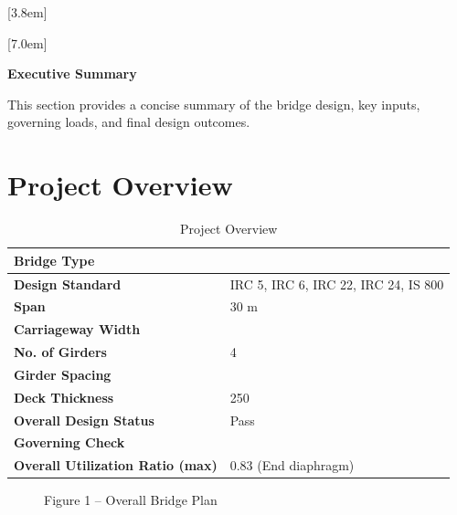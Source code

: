 \documentclass[12pt,a4paper]{report}
\numberwithin{figure}{chapter}
\begin{document}
[3.8em]
  {\normalfont}
  {\contentslabel{2.3em}}
  {\hspace*{-2.3em}}
  {\hfill\contentspage}

[7.0em]
  {\normalfont}
  {\contentslabel{3.2em}}
  {\hspace*{-3.2em}}
  {\hfill\contentspage}

\newpage
\renewcommand{\contentsname}{\centering\Large\bfseries Table of Contents}
\tableofcontents


\newpage
{\centering\Large\bfseries Executive Summary\par}
\vspace{0.8em}
\setcounter{table}{0}
\renewcommand{\thetable}{E.\arabic{table}}

This section provides a concise summary of the bridge design, key inputs, governing loads, and final design outcomes.

\section*{Project Overview}
\label{sec:project-overview}

\begin{table}[H]
\centering
{}
\caption{Project Overview}
\begin{tabular}{|L{5.73cm}|L{8.85cm}|}
\hline
\textbf{Bridge Type} &  \\
\hline
\textbf{Design Standard} & IRC 5, IRC 6, IRC 22, IRC 24, IS 800 \\
\hline
\textbf{Span} & 30 m \\
\hline
\textbf{Carriageway Width} &  \\
\hline
\textbf{No. of Girders} & 4 \\
\hline
\textbf{Girder Spacing} &  \\
\hline
\textbf{Deck Thickness} & 250 \\
\hline
\textbf{Overall Design Status} & Pass \\
\hline
\textbf{Governing Check} &  \\
\hline
\textbf{Overall Utilization Ratio (max)} & 0.83 (End diaphragm) \\
\hline
\end{tabular}
\end{table}

\begin{figure}[H]
\centering
{}
\caption*{Figure 1 -- Overall Bridge Plan}
\end{figure}
\end{document}
